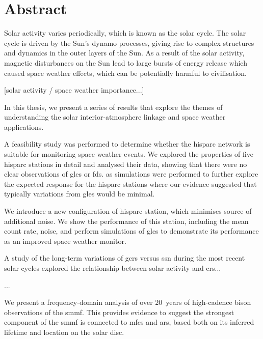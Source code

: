 \chapter*{Abstract}

Solar activity varies periodically, which is known as the solar cycle. The solar cycle is driven by the Sun's dynamo processes, giving rise to complex structures and dynamics in the outer layers of the Sun. As a result of the solar activity, magnetic disturbances on the Sun lead to large bursts of energy release which caused space weather effects, which can be potentially harmful to civilisation.

[solar activity / space weather importance...]


In this thesis, we present a series of results that explore the themes of understanding the solar interior-atmosphere linkage and space weather applications.

A feasibility study was performed to determine whether the \gls{hisparc} network is suitable for monitoring space weather events. We explored the properties of five \gls{hisparc} stations in detail and analysed their data, showing that there were no clear observations of \glspl{gle} or \glspl{fd}. \gls{as} simulations were performed to further explore the expected response for the \gls{hisparc} stations where our evidence suggested that typically variations from \glspl{gle} would be minimal.

We introduce a new configuration of \gls{hisparc} station, which minimises source of additional noise. We show the performance of this station, including the mean count rate, noise, and perform simulations of \glspl{gle} to demonstrate its performance as an improved space weather monitor.

A study of the long-term variations of \glspl{gcr} versus \gls{ssn} during the most recent solar cycles explored the relationship between solar activity and \glspl{cr}...

...

We present a frequency-domain analysis of over 20~years of high-cadence \gls{bison} observations of the \gls{smmf}. This provides evidence to suggest the strongest component of the \gls{smmf} is connected to \glspl{mfc} and \glspl{ar}, based both on its inferred lifetime and location on the solar disc.